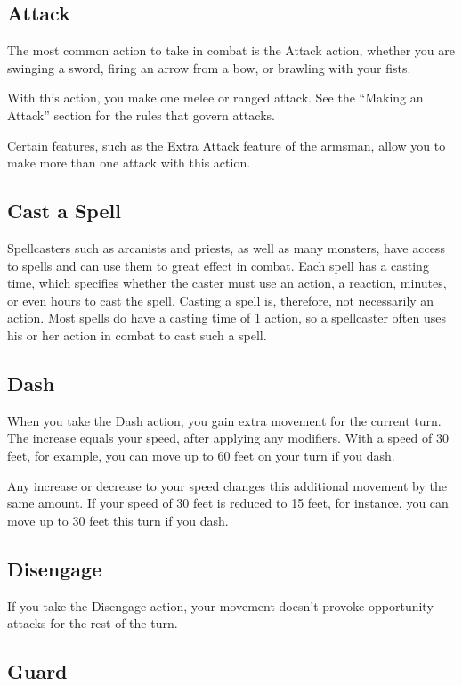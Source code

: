\subsection{Attack}

The most common action to take in combat is the Attack action, whether you are swinging a sword, firing an arrow from a bow, or brawling with your fists.

With this action, you make one melee or ranged attack. See the “Making an Attack” section for the rules that govern attacks.

Certain features, such as the Extra Attack feature of the armsman, allow you to make more than one attack with this action.

\subsection{Cast a Spell}

Spellcasters such as arcanists and priests, as well as many monsters, have access to spells and can use them to great effect in combat. Each spell has a casting time, which specifies whether the caster must use an action, a reaction, minutes, or even hours to cast the spell. Casting a spell is, therefore, not necessarily an action. Most spells do have a casting time of 1 action, so a spellcaster often uses his or her action in combat to cast such a spell.

\subsection{Dash}

When you take the Dash action, you gain extra movement for the current turn. The increase equals your speed, after applying any modifiers. With a speed of 30 feet, for example, you can move up to 60 feet on your turn if you dash.

Any increase or decrease to your speed changes this additional movement by the same amount. If your speed of 30 feet is reduced to 15 feet, for instance, you can move up to 30 feet this turn if you dash.

\subsection{Disengage}

If you take the Disengage action, your movement doesn't provoke opportunity attacks for the rest of the turn.

\subsection{Guard}

